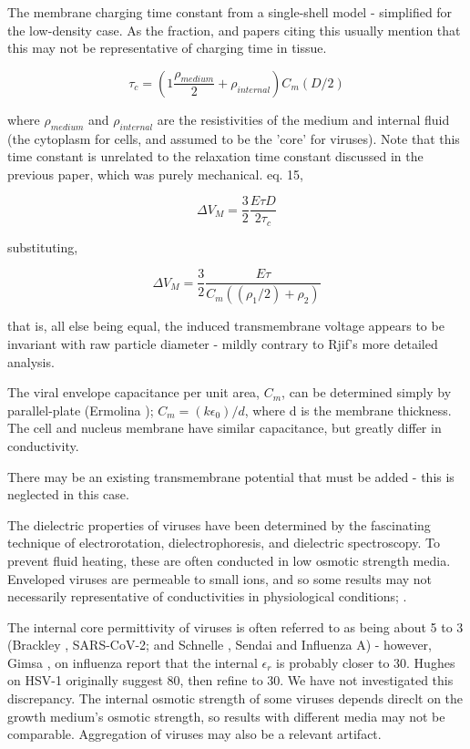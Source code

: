 \documentclass[fleqn,10pt]{article}
\begin{document}
The membrane charging time constant from a single-shell model \cite{Ultrashort2004} - simplified for the low-density case. As the fraction, and papers citing this usually mention that this may not be representative of charging time in tissue.

$$\tau_c = \left(1 \frac{\rho_{medium}}{2} + \rho_{internal}\right) C_m (D/2)$$

where $\rho_{medium}$ and $\rho_{internal}$ are the resistivities of the medium and internal fluid (the cytoplasm for cells, and assumed to be the 'core' for viruses). Note that this time constant is unrelated to the relaxation time constant discussed in the previous paper, which was purely mechanical. \cite{Bioelectric2007} eq. 15, 

$$\Delta V_M = \frac{3}{2}\frac{E\tau D}{2 \tau_c }$$

substituting,

$$\Delta V_M = \frac{3}{2}\frac{E \tau}{C_m ((\rho_1/2) + \rho_2)}$$

that is, all else being equal, the induced transmembrane voltage appears to be invariant with raw particle diameter - mildly contrary to Rjif's more detailed analysis.

The viral envelope capacitance per unit area, $C_m$, can be determined simply by parallel-plate (Ermolina \cite{Study2001}); $C_m = (k\epsilon_0) / d$, where d is the membrane thickness. The cell and nucleus membrane have similar capacitance, but greatly differ in conductivity. 

There may be an existing transmembrane potential that must be added - this is neglected in this case.

The dielectric properties of viruses have been determined by the fascinating technique of electrorotation, dielectrophoresis, and dielectric spectroscopy. To prevent fluid heating, these are often conducted in low osmotic strength media. Enveloped viruses are permeable to small ions, and so some results may not necessarily representative of conductivities in physiological conditions; \cite{Assessment}.

The internal core permittivity of viruses is often referred to as being about 5 to 3 (Brackley \cite{Electrostatic2020}, SARS-CoV-2; and Schnelle \cite{Trapping1996}, Sendai and Influenza A) - however, Gimsa \cite{New1999}, on influenza report that the internal $\epsilon_r$ is probably closer to 30. Hughes on HSV-1 originally suggest 80\cite{Manipulation1998}, then refine to 30\cite{Dielectrophoretic2001}. We have not investigated this discrepancy. The internal osmotic strength of some viruses depends direclt on the growth medium's osmotic strength\cite{Osmotic2003}, so results with different media may not be comparable. Aggregation of viruses may also be a relevant artifact. 
\end{document}
